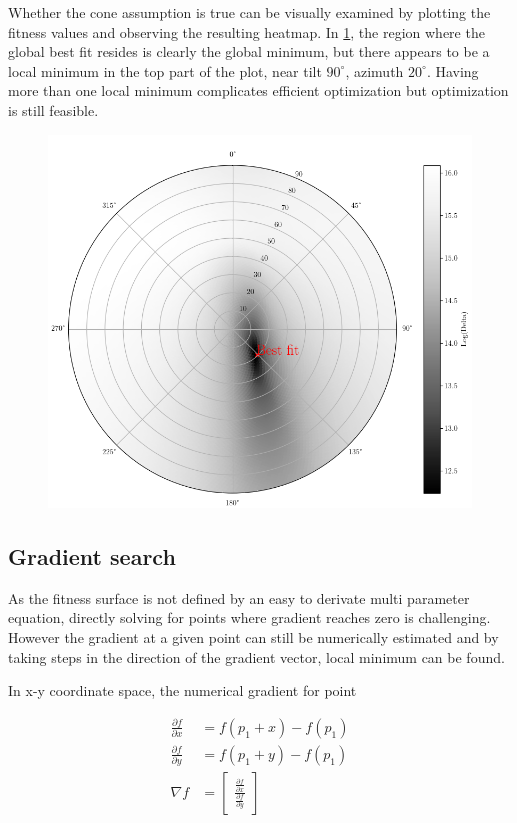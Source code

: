 Whether the cone assumption is true can be visually examined by plotting the fitness values and observing the resulting heatmap. In \ref{fig_cone_shape}, the region where the global best fit resides is clearly the global minimum, but there appears to be a local minimum in the top part of the plot, near tilt $90^\circ$, azimuth $20^\circ$. Having more than one local minimum complicates efficient optimization but optimization is still feasible.


\begin{figure}[h]
\centering
\includegraphics[width=0.6\linewidth]{pics/10kfitshelsinki}
\label{fig_cone_shape}
\end{figure}

\subsection{Gradient search}
As the fitness surface is not defined by an easy to derivate multi parameter equation, directly solving for points where gradient reaches zero is challenging. However the gradient at a given point can still be numerically estimated and by taking steps in the direction of the gradient vector, local minimum can be found.

In x-y coordinate space, the numerical gradient for point 

\begin{align}
	\frac{\partial f}{\partial x}  &= f(p_1+x) - f(p_1)\\
	\frac{\partial f}{\partial y}  &= f(p_1+y) - f(p_1) \\
	\nabla f &= \begin{bmatrix}
	\frac{\frac{\partial f}{\partial x}}{\frac{\partial f}{\partial y}}
	\end{bmatrix} 
\end{align}

